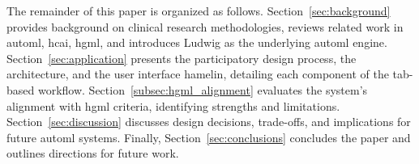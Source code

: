The remainder of this paper is organized as follows. Section~\ref{sec:background} provides background on clinical research methodologies, reviews related work in \gls{automl}, \gls{hcai}, \gls{hgml}, and introduces Ludwig as the underlying \gls{automl} engine. Section~\ref{sec:application} presents the participatory design process, the architecture, and the user interface \gls{hamelin}, detailing each component of the tab-based workflow. Section~\ref{subsec:hgml_alignment} evaluates the system's alignment with \gls{hgml} criteria, identifying strengths and limitations. Section~\ref{sec:discussion} discusses design decisions, trade-offs, and implications for future \gls{automl} systems. Finally, Section~\ref{sec:conclusions} concludes the paper and outlines directions for future work.
